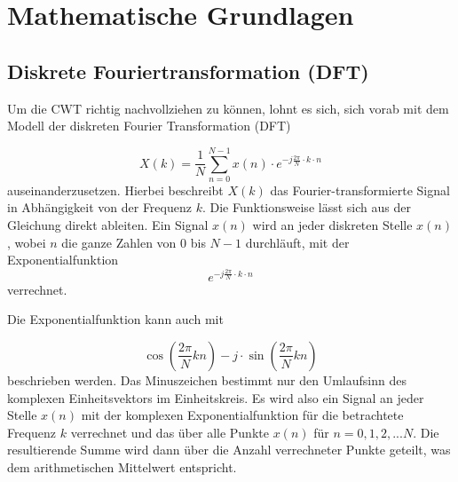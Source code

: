 %
%
%
%
\section{Mathematische Grundlagen
\label{wavelets:section:teil1}}

\subsection{Diskrete Fouriertransformation (DFT)
\label{wavelets:subsection:DFT}}
Um die CWT richtig nachvollziehen zu können, lohnt es sich, sich vorab mit dem Modell der diskreten Fourier Transformation (DFT) \cite{wavelets:Hayes.1996} 

\begin{equation}
	X(k)=\frac{1}{N}\sum_{n=0}^{N-1}x(n)\cdot e^{-j\frac{2\pi}{N}\cdot k\cdot n}
	\label{wavelets:equation1}
\end{equation}
auseinanderzusetzen. Hierbei beschreibt $X(k)$  das Fourier-transformierte Signal in Abhängigkeit von der Frequenz $k$.
Die Funktionsweise lässt sich aus der Gleichung direkt ableiten.
Ein Signal $x(n)$ wird an jeder diskreten Stelle $x(n)$, wobei $n$ die ganze Zahlen von $0$ bis $N-1$ durchläuft, mit der Exponentialfunktion \[e^{-j\frac{2\pi}{N}\cdot k\cdot n}\] verrechnet.

Die Exponentialfunktion kann auch mit

\begin{equation}
	\cos \left( \frac{2\pi}{N}kn \right) -j\cdot \sin \left( \frac{2\pi}{N}kn \right)
	\label{wavelets:equation2}
\end{equation} 
beschrieben werden. Das Minuszeichen bestimmt nur den Umlaufsinn des komplexen Einheitsvektors im Einheitskreis.
Es wird also ein Signal an jeder Stelle $x(n)$ mit der komplexen Exponentialfunktion für die betrachtete Frequenz $k$ verrechnet und das über alle Punkte $x(n)$ für $n=0,1,2,...N$. Die resultierende Summe wird dann über die Anzahl verrechneter Punkte geteilt, was dem arithmetischen Mittelwert entspricht.

